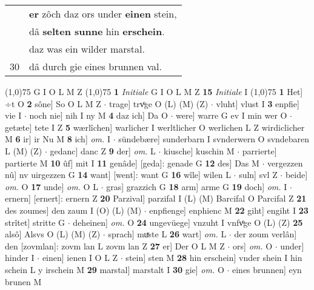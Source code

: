 \documentclass[8pt,a4paper,notitlepage]{article}
\begin{document}
\begin{table}[ht]
\begin{minipage}[t]{0.5\linewidth}
\begin{tabular}{rl}
 & \textbf{er} zôch daz ors under \textbf{einen} stein,\\ 
 & dâ \textbf{selten sunne} hin \textbf{erschein}.\\ 
 & daz was ein wilder marstal.\\ 
30 & dâ durch gie eines brunnen val.\\ 
\end{tabular}
\scriptsize
\line(1,0){75} \newline
G I O L M Z \newline
\line(1,0){75} \newline
\textbf{1} \textit{Initiale} G I O L M Z  \textbf{15} \textit{Initiale} I  \newline
\line(1,0){75} \newline
\textbf{1} Het] ÷t O \textbf{2} sône] So O L M Z  $\cdot$ trage] trvͦge O (L) (M) (Z)  $\cdot$ vluht] vlust I \textbf{3} enpfie] vie I  $\cdot$ noch nie] nih I ny M \textbf{4} daz ich] Da O  $\cdot$ were] warre G ev I min wer O  $\cdot$ getæte] tete I Z \textbf{5} wærlîchen] warlicher I werltlicher O werlichen L Z wirdiclicher M \textbf{6} ir] ir Nu M \textbf{8} ich] \textit{om.} I  $\cdot$ sündebære] sunderbarn I svnderwern O svndebaren L (M) (Z)  $\cdot$ gedanc] danc Z \textbf{9} der] \textit{om.} L  $\cdot$ kiusche] kuschin M  $\cdot$ parrierte] partierte M \textbf{10} ûf] mit I \textbf{11} genâde] [geda]: genade G \textbf{12} des] Das M  $\cdot$ vergezzen nû] nv uirgezzen G \textbf{14} want] [went]: want G \textbf{16} wîle] wilen L  $\cdot$ suln] svl Z  $\cdot$ beide] \textit{om.} O \textbf{17} unde] \textit{om.} O L  $\cdot$ gras] grazzich G \textbf{18} arm] arme G \textbf{19} doch] \textit{om.} I  $\cdot$ ernern] [ernert]: ernern Z \textbf{20} Parzival] parzifal I (L) (M) Barcifal O Parcifal Z \textbf{21} des zoumes] den zaum I (O) (L) (M)  $\cdot$ enpfienge] enphienc M \textbf{22} giht] engiht I \textbf{23} strîtet] stritte G  $\cdot$ deheinen] \textit{om.} O \textbf{24} ungevüege] vnzuht I vnfvͦge O (L) (Z) \textbf{25} alsô] Alsvs O (L) (M) (Z)  $\cdot$ sprach] muͯste L \textbf{26} wart] \textit{om.} L  $\cdot$ der zoum verlân] den [zovmlan]: zovm lan L zovm lan Z \textbf{27} er] Der O L M Z  $\cdot$ ors] \textit{om.} O  $\cdot$ under] hinder I  $\cdot$ einen] ienen I O L Z  $\cdot$ stein] sten M \textbf{28} hin erschein] vnder shein I hin schein L y irschein M \textbf{29} marstal] marstalt I \textbf{30} gie] \textit{om.} O  $\cdot$ eines brunnen] eyn brunen M \newline
\end{minipage}
\hspace{0.5cm}

\end{table}
\end{document}
